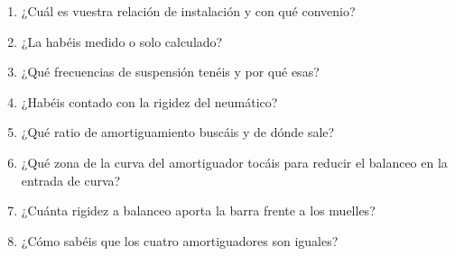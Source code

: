 \begin{juez}
\begin{enumerate}
  \item ¿Cuál es vuestra relación de instalación y con qué convenio?
  \item ¿La habéis medido o solo calculado?
  \item ¿Qué frecuencias de suspensión tenéis y por qué esas?
  \item ¿Habéis contado con la rigidez del neumático?
  \item ¿Qué ratio de amortiguamiento buscáis y de dónde sale?
  \item ¿Qué zona de la curva del amortiguador tocáis para reducir el balanceo
        en la entrada de curva?
  \item ¿Cuánta rigidez a balanceo aporta la barra frente a los muelles?
  \item ¿Cómo sabéis que los cuatro amortiguadores son iguales?
\end{enumerate}
\end{juez}
